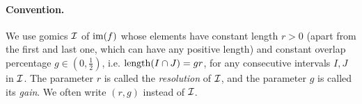 \begin{itemize}
\end{itemize}





\paragraph*{Convention.}  %
We use gomics $\mathcal{I}$ of $\mathrm{im}(f)$ whose elements have constant length $r>0$ (apart from the first and last one, which can have any positive length) 
and constant overlap percentage $g\in\left(0,\frac 12\right)$, i.e. ${\rm length}(I\cap J) = gr$,
for any consecutive intervals $I,J$ in $\mathcal{I}$.
The parameter $r$ is called the {\em resolution}
of $\mathcal{I}$, and the parameter $g$ is called its {\em gain}. We often write $(r,g)$ instead of $\mathcal{I}$.






